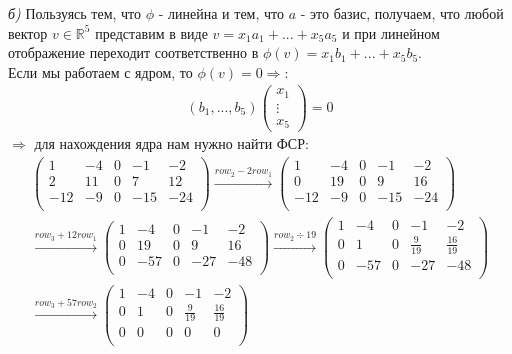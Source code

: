 \documentclass[a4paper,11pt]{article}
\begin{document}
\textsl{б) } 
Пользуясь тем, что $ \phi $ - линейна и тем, что $ a $ - это базис, получаем, что любой вектор $ v \in \mathbb{R}^5 $ представим в виде $ v = x_1a_1 + ... + x_5a_5 $ и при линейном отображение переходит соответственно в $ \phi(v) = x_1b_1 + ... + x_5b_5 $. \\[3pt]
Если мы работаем с ядром, то $ \phi(v) = 0 \Rightarrow $:
\begin{gather*}
	(b_1, ..., b_5)
	\begin{pmatrix}
	x_1 \\
	\vdots \\
	x_5
	\end{pmatrix}
	 = 0
\end{gather*}
$ \Rightarrow $ для нахождения ядра нам нужно найти ФСР:
\begin{gather*}
\begin{pmatrix}
1 & -4 & 0 & -1 & -2 \\[2pt]
2 & 11 & 0 & 7 & 12 \\[2pt]
-12 & -9 & 0 & -15 & -24 \\[2pt]
\end{pmatrix}
\stackrel{ row_{2} - 2row_{1} }{\longrightarrow}
\begin{pmatrix}
1 & -4 & 0 & -1 & -2 \\[2pt]
0 & 19 & 0 & 9 & 16 \\[2pt]
-12 & -9 & 0 & -15 & -24 \\[2pt]
\end{pmatrix}
\\[3pt]
\stackrel{ row_{3} + 12row_{1} }{\longrightarrow}
\begin{pmatrix}
1 & -4 & 0 & -1 & -2 \\[2pt]
0 & 19 & 0 & 9 & 16 \\[2pt]
0 & -57 & 0 & -27 & -48 \\[2pt]
\end{pmatrix}
\stackrel{ row_{2} \div 19 }{\longrightarrow}
\begin{pmatrix}
1 & -4 & 0 & -1 & -2 \\[2pt]
0 & 1 & 0 & \frac{9}{19} & \frac{16}{19} \\[2pt]
0 & -57 & 0 & -27 & -48 \\[2pt]
\end{pmatrix}
\\[3pt]
\stackrel{ row_{3} + 57row_{2} }{\longrightarrow}
\begin{pmatrix}
1 & -4 & 0 & -1 & -2 \\[2pt]
0 & 1 & 0 & \frac{9}{19} & \frac{16}{19} \\[2pt]
0 & 0 & 0 & 0 & 0 \\[2pt]
\end{pmatrix}
\end{gather*}
\end{document}
